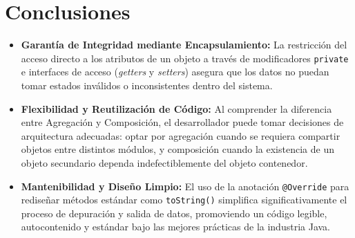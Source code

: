 \documentclass[12pt,a4paper]{article}
\begin{document}
\newpage

\section{Conclusiones}

\begin{itemize}
    \item \textbf{Garantía de Integridad mediante Encapsulamiento:} La restricción del acceso directo a los atributos de un objeto a través de modificadores \texttt{private} e interfaces de acceso (\emph{getters} y \emph{setters}) asegura que los datos no puedan tomar estados inválidos o inconsistentes dentro del sistema.
    \item \textbf{Flexibilidad y Reutilización de Código:} Al comprender la diferencia entre Agregación y Composición, el desarrollador puede tomar decisiones de arquitectura adecuadas: optar por agregación cuando se requiera compartir objetos entre distintos módulos, y composición cuando la existencia de un objeto secundario dependa indefectiblemente del objeto contenedor.
    \item \textbf{Mantenibilidad y Diseño Limpio:} El uso de la anotación \texttt{@Override} para rediseñar métodos estándar como \texttt{toString()} simplifica significativamente el proceso de depuración y salida de datos, promoviendo un código legible, autocontenido y estándar bajo las mejores prácticas de la industria Java.
\end{itemize}
\end{document}
